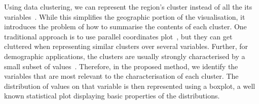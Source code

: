 Using data clustering, we can represent the region's cluster instead of all the
its variables~\citep{Alce2018,Valdivia2015,VonLandesberger2016}. While this
simplifies the geographic portion of the visualisation, it introduces the
problem of how to summarise the contents of each cluster. One traditional
approach is to use parallel coordinates plot~\citep{ferreira2015urbane}, but
they can get cluttered when representing similar clusters over several
variables. Further, for demographic applications, the clusters are usually
strongly characterised by a small subset of
values~\citep{Delmelle2016,Delmelle2017}. Therefore, in the proposed method, we
identify the variables that are most relevant to the characterisation of each
cluster. The distribution of values on that variable is then represented using a
boxplot, a well known statistical plot displaying basic properties of the
distributions.